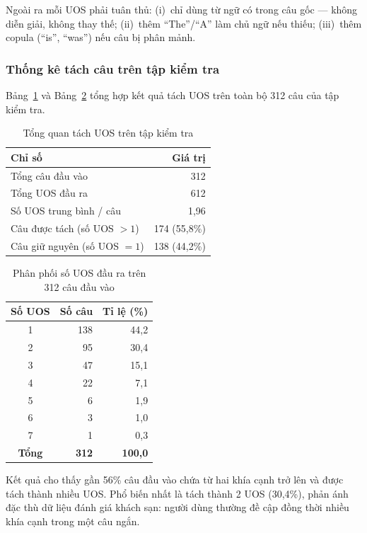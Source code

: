 Ngoài ra mỗi UOS phải tuân thủ: (i)~chỉ dùng từ ngữ có trong câu gốc
— không diễn giải, không thay thế; (ii)~thêm ``The''/``A'' làm chủ
ngữ nếu thiếu; (iii)~thêm copula (``is'', ``was'') nếu câu bị phân
mảnh.

\subsubsection*{Thống kê tách câu trên tập kiểm tra}

Bảng~\ref{tab:uos_stats} và Bảng~\ref{tab:uos_dist} tổng hợp kết quả
tách UOS trên toàn bộ 312 câu của tập kiểm tra.

\begin{table}[H]
\centering
\caption{Tổng quan tách UOS trên tập kiểm tra}
\label{tab:uos_stats}
\begin{tabular}{@{}lr@{}}
\toprule
\textbf{Chỉ số} & \textbf{Giá trị} \\
\midrule
Tổng câu đầu vào               & 312 \\
Tổng UOS đầu ra                & 612 \\
Số UOS trung bình / câu        & 1{,}96 \\
Câu được tách (số UOS $> 1$)  & 174 (55{,}8\%) \\
Câu giữ nguyên (số UOS $= 1$) & 138 (44{,}2\%) \\
\bottomrule
\end{tabular}
\end{table}

\begin{table}[H]
\centering
\caption{Phân phối số UOS đầu ra trên 312 câu đầu vào}
\label{tab:uos_dist}
\begin{tabular}{@{}crr@{}}
\toprule
\textbf{Số UOS} & \textbf{Số câu} & \textbf{Tỉ lệ (\%)} \\
\midrule
1 & 138 & 44{,}2 \\
2 &  95 & 30{,}4 \\
3 &  47 & 15{,}1 \\
4 &  22 &  7{,}1 \\
5 &   6 &  1{,}9 \\
6 &   3 &  1{,}0 \\
7 &   1 &  0{,}3 \\
\midrule
\textbf{Tổng} & \textbf{312} & \textbf{100{,}0} \\
\bottomrule
\end{tabular}
\end{table}

Kết quả cho thấy gần 56\% câu đầu vào chứa từ hai khía cạnh trở lên
và được tách thành nhiều UOS. Phổ biến nhất là tách thành 2 UOS
(30,4\%), phản ánh đặc thù dữ liệu đánh giá khách sạn: người dùng
thường đề cập đồng thời nhiều khía cạnh trong một câu ngắn.


